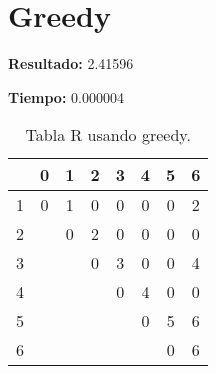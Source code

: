 \documentclass[a4paper]{article}
\begin{document}
\section{Greedy}
\textbf{Resultado:} 2.41596

\textbf{Tiempo:} 0.000004

\begin{table}[H]
\centering
\relax
\begin{tabular}{|c|c|c|c|c|c|c|c|}
\hline
 & 0\cellcolor{blue!20} & 1\cellcolor{blue!20} & 2\cellcolor{blue!20} & 3\cellcolor{blue!20} & 4\cellcolor{blue!20} & 5\cellcolor{blue!20} & 6\cellcolor{blue!20} \\
\hline
1\cellcolor{blue!20} & 0 & 1 & 0 & 0 & 0 & 0 & 2 \\
\hline
2\cellcolor{blue!20} &  & 0 & 2 & 0 & 0 & 0 & 0 \\
\hline
3\cellcolor{blue!20} &  &  & 0 & 3 & 0 & 0 & 4 \\
\hline
4\cellcolor{blue!20} &  &  &  & 0 & 4 & 0 & 0 \\
\hline
5\cellcolor{blue!20} &  &  &  &  & 0 & 5 & 6 \\
\hline
6\cellcolor{blue!20} &  &  &  &  &  & 0 & 6 \\
\hline
\end{tabular}
\caption{Tabla R usando greedy.}
\end{table}
\begin{center}
\end{center}
\end{document}
